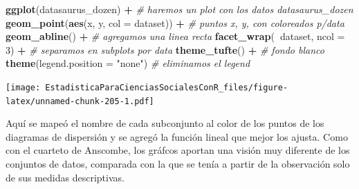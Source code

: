 \documentclass[]{book}
\newenvironment{Shaded}{\begin{snugshade}}{\end{snugshade}}
\newcommand{\CommentTok}[1]{\textcolor[rgb]{0.56,0.35,0.01}{\textit{#1}}}
\newcommand{\DataTypeTok}[1]{\textcolor[rgb]{0.13,0.29,0.53}{#1}}
\newcommand{\DecValTok}[1]{\textcolor[rgb]{0.00,0.00,0.81}{#1}}
\newcommand{\KeywordTok}[1]{\textcolor[rgb]{0.13,0.29,0.53}{\textbf{#1}}}
\newcommand{\NormalTok}[1]{#1}
\newcommand{\OperatorTok}[1]{\textcolor[rgb]{0.81,0.36,0.00}{\textbf{#1}}}
\newcommand{\StringTok}[1]{\textcolor[rgb]{0.31,0.60,0.02}{#1}}
\begin{document}
\begin{Shaded}
\begin{Highlighting}[]
\KeywordTok{ggplot}\NormalTok{(datasaurus_dozen) }\OperatorTok{+}\StringTok{ }\CommentTok{# haremos un plot con los datos datasaurus_dozen}
\StringTok{  }\KeywordTok{geom_point}\NormalTok{(}\KeywordTok{aes}\NormalTok{(x, y, }\DataTypeTok{col =}\NormalTok{ dataset)) }\OperatorTok{+}\StringTok{ }\CommentTok{# puntos x, y, con coloreados p/data}
\StringTok{  }\KeywordTok{geom_abline}\NormalTok{() }\OperatorTok{+}\StringTok{ }\CommentTok{# agregamos una linea recta}
\StringTok{  }\KeywordTok{facet_wrap}\NormalTok{(}\OperatorTok{~}\NormalTok{dataset, }\DataTypeTok{ncol =} \DecValTok{3}\NormalTok{) }\OperatorTok{+}\StringTok{ }\CommentTok{# separamos en subplots por data}
\StringTok{  }\KeywordTok{theme_tufte}\NormalTok{() }\OperatorTok{+}\StringTok{ }\CommentTok{# fondo blanco}
\StringTok{  }\KeywordTok{theme}\NormalTok{(}\DataTypeTok{legend.position =} \StringTok{"none"}\NormalTok{) }\CommentTok{# eliminamos el legend}
\end{Highlighting}
\end{Shaded}

\texttt{[image: EstadisticaParaCienciasSocialesConR\_files/figure-latex/unnamed-chunk-205-1.pdf]}

Aquí se mapeó el nombre de cada subconjunto al color de los puntos de los diagramas de dispersión y se agregó la función lineal que mejor los ajusta.
Como con el cuarteto de Anscombe, los gráfcos aportan una visión muy diferente de los conjuntos de datos, comparada con la que se tenía a partir de la observación solo de sus medidas descriptivas.


\end{document}
